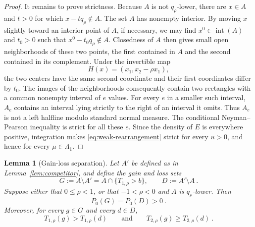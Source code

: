 \documentclass[12pt]{article}
\newtheorem{lemma}{Lemma}
\theoremstyle{remark}
\begin{document}
\begin{proof}
It remains to prove strictness.  Because $A$ is not $q_\rho$-lower, there are
$x\in A$ and $t>0$ for which $x-tq_\rho\notin A$.  The set $A$ has nonempty
interior.  By moving $x$ slightly toward an interior point of $A$, if
necessary, we may find $x^0\in\operatorname{int}(A)$ and $t_0>0$ such that
$x^0-t_0q_\rho\notin A$.  Closedness of $A$ then gives small open
neighborhoods of these two points, the first contained in $A$ and the second
contained in its complement.  Under the invertible map
\[
H(x)=(x_1,x_2-\rho x_1),
\]
the two centers have the same second coordinate and their first coordinates
differ by $t_0$.  The images of the neighborhoods consequently contain two
rectangles with a common nonempty interval of $e$ values.  For every $e$ in a
smaller such interval, $A_e$ contains an interval lying strictly to the right
of an interval it omits.  Thus $A_e$ is not a left halfline modulo standard
normal measure.  The conditional Neyman--Pearson inequality is strict for all
these $e$.  Since the density of $E$ is everywhere positive, integration
makes \eqref{eq:weak-rearrangement} strict for every $u>0$, and hence for every
$\mu\in\Lambda_1$.
\end{proof}

\begin{lemma}[Gain-loss separation]\label{lem:gain-loss}
Let $A'$ be defined as in Lemma~\ref{lem:competitor}, and define the gain and
loss sets
\[
G:=A\setminus A'
=A\cap\{T_{1,\rho}>b\},
\qquad
D:=A'\setminus A~.
\]
Suppose either that $0\le\rho<1$, or that $-1<\rho<0$ and $A$ is
$q_\rho$-lower.  Then
\[
P_0(G)=P_0(D)>0~.
\]
Moreover, for every $g\in G$ and every $d\in D$,
\[
T_{1,\rho}(g)>T_{1,\rho}(d)
\qquad\text{and}\qquad
T_{2,\rho}(g)\ge T_{2,\rho}(d)~.
\]
\end{lemma}
\end{document}
